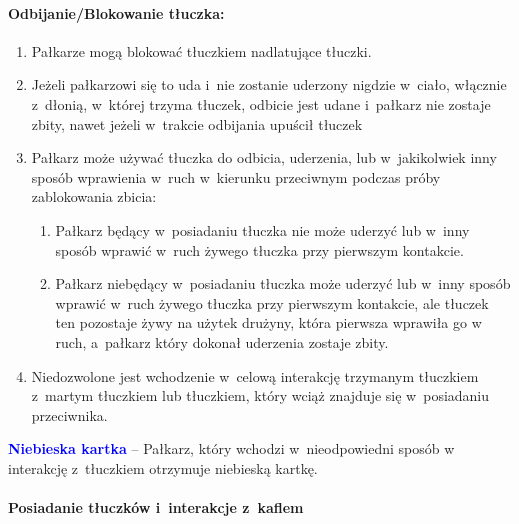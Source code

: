 \documentclass[12pt,a4paper]{article}
\newcommand\bluecard[1]{\bgroup\textcolor{blue}{\textbf{#1}}}
\begin{document}
\paragraph{Odbijanie/Blokowanie tłuczka:}

\begin{enumerate}
	\item
	      Pałkarze mogą blokować tłuczkiem nadlatujące tłuczki.
	\item
	      Jeżeli pałkarzowi się to uda i~nie zostanie uderzony nigdzie w~ciało,
	      włącznie z~dłonią, w~której trzyma tłuczek, odbicie jest udane i~pałkarz nie zostaje zbity, nawet jeżeli w~trakcie odbijania upuścił
	      tłuczek
	\item
	      Pałkarz może używać tłuczka do odbicia, uderzenia, lub w~jakikolwiek
	      inny sposób wprawienia w~ruch w~kierunku przeciwnym podczas próby
	      zablokowania zbicia:

	      \begin{enumerate}
		      \item
		            Pałkarz będący w~posiadaniu tłuczka nie może uderzyć lub w~inny
		            sposób wprawić w~ruch żywego tłuczka przy pierwszym kontakcie.
		      \item
		            Pałkarz niebędący w~posiadaniu tłuczka może uderzyć lub w~inny
		            sposób wprawić w~ruch żywego tłuczka przy pierwszym kontakcie, ale
		            tłuczek ten pozostaje żywy na użytek drużyny, która pierwsza wprawiła go w ruch, a~pałkarz który dokonał uderzenia zostaje zbity.
	      \end{enumerate}
	\item
	      Niedozwolone jest wchodzenie w~celową interakcję trzymanym tłuczkiem z~martym tłuczkiem lub tłuczkiem, który wciąż znajduje
	      się w~posiadaniu przeciwnika.
\end{enumerate}

\bluecard{Niebieska kartka} -- Pałkarz, który wchodzi w~nieodpowiedni sposób
w interakcję z~tłuczkiem otrzymuje niebieską kartkę.

\paragraph{Posiadanie tłuczków i~interakcje z~kaflem}
\end{document}
